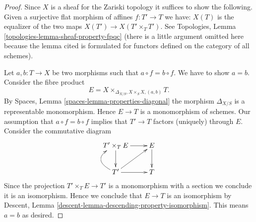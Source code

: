 \documentclass[10pt,a4paper]{amsart}
\theoremstyle{plain}
\theoremstyle{definition}
\theoremstyle{remark}
\numberwithin{equation}{subsection}
\begin{document}
\begin{proof}
Since $X$ is a sheaf for the Zariski topology it suffices to show
the following. Given a surjective flat morphism of affines
$f : T' \to T$ we have:
$X(T)$ is the equalizer of the two maps $X(T') \to X(T' \times_T T')$.
See Topologies, Lemma \ref{topologies-lemma-sheaf-property-fpqc}
(there is a little argument omitted here because the lemma cited
is formulated for functors defined on the category of all schemes).

\medskip\noindent
Let $a, b : T \to X$ be two morphisms such that $a \circ f = b \circ f$.
We have to show $a = b$. Consider the fibre product
$$
E = X \times_{\Delta_{X/S}, X \times_S X, (a, b)} T.
$$
By Spaces, Lemma \ref{spaces-lemma-properties-diagonal}
the morphism $\Delta_{X/S}$ is a representable monomorphism. Hence
$E \to T$ is a monomorphism of schemes. Our assumption that
$a \circ f = b \circ f$ implies that $T' \to T$ factors (uniquely) through $E$.
Consider the commutative diagram
$$
\xymatrix{
T' \times_T E \ar[r] \ar[d] & E \ar[d] \\
T' \ar[r] \ar@/^5ex/[u] \ar[ru] & T
}
$$
Since the projection $T' \times_T E \to T'$ is a monomorphism
with a section we conclude it is an isomorphism. Hence we conclude that
$E \to T$ is an isomorphism by
Descent, Lemma \ref{descent-lemma-descending-property-isomorphism}.
This means $a = b$ as desired.


\end{proof}
\end{document}
